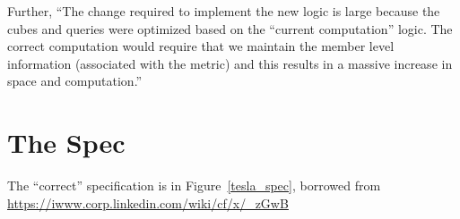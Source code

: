 Further, ``The
change required to implement the new logic is large because the cubes
and queries were optimized based on the ``current computation'' logic. The
correct computation would require that we maintain the member level
information (associated with the metric) and this results in a massive
increase in space and computation.''

\section{The Spec}

The ``correct'' specification is in Figure~\ref{tesla_spec}, borrowed
from
\url{https://iwww.corp.linkedin.com/wiki/cf/x/_zGwB}


\begin{figure}
\centering
{}
\end{figure}

